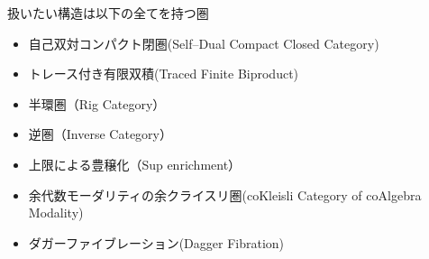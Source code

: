 \documentclass[type_judgement.tex]{subfiles}
\begin{document}
扱いたい構造は以下の全てを持つ圏
\begin{itemize}
    \item 自己双対コンパクト閉圏(Self--Dual Compact Closed Category)
    \item トレース付き有限双積(Traced Finite Biproduct)
    \item 半環圏（Rig Category）
    \item 逆圏（Inverse Category）
    \item 上限による豊穣化（Sup enrichment）
    \item 余代数モーダリティの余クライスリ圏(coKleisli Category of coAlgebra Modality)
    \item ダガーファイブレーション(Dagger Fibration)
\end{itemize}
\end{document}
